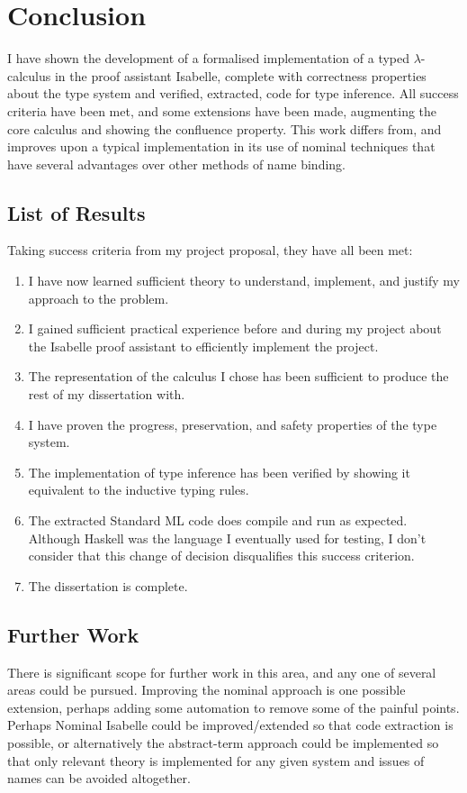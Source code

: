 \chapter{Conclusion}
I have shown the development of a formalised implementation of a typed \(\lambda\)-calculus in the proof assistant Isabelle, complete with correctness properties about the type system and verified, extracted, code for type inference.
All success criteria have been met, and some extensions have been made, augmenting the core calculus and showing the confluence property.
This work differs from, and improves upon a typical implementation in its use of nominal techniques that have several advantages over other methods of name binding.

\section{List of Results}
Taking success criteria from my project proposal, they have all been met:
\begin{enumerate}
\item
I have now learned sufficient theory to understand, implement, and justify my approach to the problem.
\item
I gained sufficient practical experience before and during my project about the Isabelle proof assistant to efficiently implement the project.
\item
The representation of the calculus I chose has been sufficient to produce the rest of my dissertation with.
\item
I have proven the progress, preservation, and safety properties of the type system.
\item
The implementation of type inference has been verified by showing it equivalent to the inductive typing rules.
\item
The extracted Standard ML code does compile and run as expected.
Although Haskell was the language I eventually used for testing, I don't consider that this change of decision disqualifies this success criterion.
\item
The dissertation is complete.
\end{enumerate}

\section{Further Work}
There is significant scope for further work in this area, and any one of several areas could be pursued.
Improving the nominal approach is one possible extension, perhaps adding some automation to remove some of the painful points.
Perhaps Nominal Isabelle could be improved/extended so that code extraction is possible, or alternatively the abstract-term approach could be implemented so that only relevant theory is implemented for any given system and issues of names can be avoided altogether.

